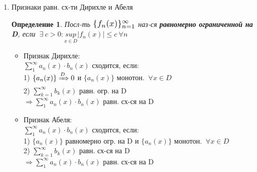 \documentclass[a4paper, 12pt]{article}
\newtheorem{Definition}{Определение}
\begin{document}
\begin{enumerate}
        \item
        Признаки равн. сх-ти Дирихле и Абеля\\
        \begin{Definition}
            Посл-ть $\scalebox{1.2}{$\{ f_n(x) \}^{\infty}_{n = 1}$}$ наз-ся
            \textbf{равномерно ограниченной на D}, если $\ \exists \  c > 0:
            \underset{x \in D}{sup} \left| f_n(x) \right| \le c \ \forall n$
        \end{Definition}
        \begin{itemize}
            \item
                Признак Дирихле:\\
                $\displaystyle \sum^{\infty}_{1} a_n(x) \cdot b_n(x)$
                сходится, если:\\
                1) $\{a_n(x)\} \xRightarrow{D} 0$ и $\{ a_n(x)\}$ монотон.
                $\ \forall x \in D$ \\
                2) $\displaystyle \sum^{\infty}_{k = 1} b_k(x)$ равн. огр. на D\\
                $\Rightarrow \displaystyle \sum^{\infty}_{1} a_n(x)
                \cdot b_n(x)$ равн. сх-ся на D
            \item
                Признак Абеля:\\
                $\displaystyle \sum^{\infty}_{1} a_n(x) \cdot b_n(x)$
                сходится, если:\\
                1) $\{a_n(x)\}$ равномерно огр. на D и $\{ a_n(x)\}$ монотон.
                $\ \forall x \in D$ \\
                2) $\displaystyle \sum^{\infty}_{k = 1} b_k(x)$ равн. сх-ся на D\\
                $\Rightarrow \displaystyle \sum^{\infty}_{1} a_n(x)
                \cdot b_n(x)$ равн. сх-ся на D
        \end{itemize}
    \end{enumerate}
\end{document}
